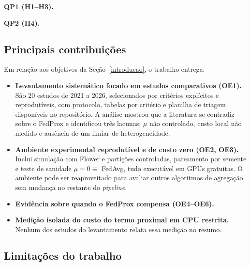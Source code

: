 \textbf{QP1 (H1--H3).} 

\textbf{QP2 (H4).} 

\subsection{Principais contribuições}

Em relação aos objetivos da Seção~\ref{introducao}, o trabalho entrega:

\begin{itemize}[leftmargin=*, itemsep=2pt]
    \item \textbf{Levantamento sistemático focado em estudos comparativos (OE1).} São 20 estudos de 2021 a 2026, selecionados por critérios explícitos e reprodutíveis, com protocolo, tabelas por critério e planilha de triagem disponíveis no repositório. A análise mostrou que a literatura se contradiz sobre o FedProx e identificou três lacunas: $\mu$ não controlado, custo local não medido e ausência de um limiar de heterogeneidade.
    \item \textbf{Ambiente experimental reprodutível e de custo zero (OE2, OE3).} Inclui simulação com Flower e partições controladas, pareamento por semente e teste de sanidade $\mu = 0 \equiv$ FedAvg, tudo executável em GPUs gratuitas. O ambiente pode ser reaproveitado para avaliar outros algoritmos de agregação sem mudança no restante do \textit{pipeline}.
    \item \textbf{Evidência sobre quando o FedProx compensa (OE4--OE6).} 
    \item \textbf{Medição isolada do custo do termo proximal em CPU restrita.}  Nenhum dos estudos do levantamento relata essa medição no resumo.
\end{itemize}

\subsection{Limitações do trabalho}

